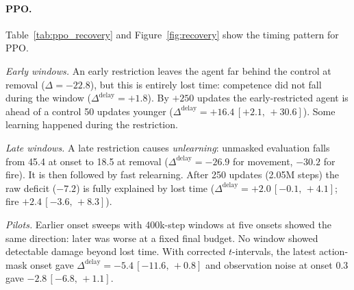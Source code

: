 \documentclass[10pt]{article} %
\newcommand{\ci}[2]{\,[#1,\,#2]}
\newcommand{\Ddel}{\Delta^{\mathrm{delay}}}
\begin{document}
\paragraph{PPO.}
Table~\ref{tab:ppo_recovery} and Figure~\ref{fig:recovery} show the timing pattern for PPO.

\emph{Early windows.} An early restriction leaves the agent far behind the control at removal ($\Delta=-22.8$), but this is entirely lost time: competence did not fall during the window ($\Ddel=+1.8$). By $+250$ updates the early-restricted agent is ahead of a control 50 updates younger ($\Ddel=+16.4\ci{+2.1}{+30.6}$). Some learning happened during the restriction.

\emph{Late windows.} A late restriction causes \emph{unlearning}: unmasked evaluation falls from 45.4 at onset to 18.5 at removal ($\Ddel=-26.9$ for movement, $-30.2$ for fire). It is then followed by fast relearning. After 250 updates (2.05M steps) the raw deficit ($-7.2$) is fully explained by lost time ($\Ddel=+2.0\ci{-0.1}{+4.1}$; fire $+2.4\ci{-3.6}{+8.3}$).

\emph{Pilots.} Earlier onset sweeps with 400k-step windows at five onsets showed the same direction: later was worse at a fixed final budget. No window showed detectable damage beyond lost time. With corrected $t$-intervals, the latest action-mask onset gave $\Ddel=-5.4\ci{-11.6}{+0.8}$ and observation noise at onset 0.3 gave $-2.8\ci{-6.8}{+1.1}$.
\end{document}
